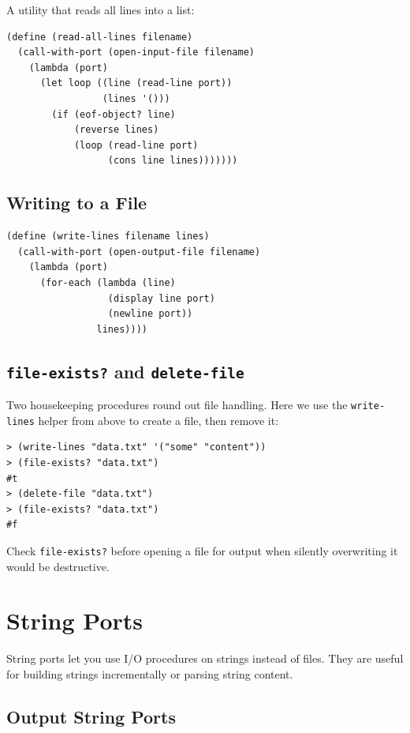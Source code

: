 A utility that reads all lines into a list:

\begin{lstlisting}
(define (read-all-lines filename)
  (call-with-port (open-input-file filename)
    (lambda (port)
      (let loop ((line (read-line port))
                 (lines '()))
        (if (eof-object? line)
            (reverse lines)
            (loop (read-line port)
                  (cons line lines)))))))
\end{lstlisting}

\subsection{Writing to a File}

\begin{lstlisting}
(define (write-lines filename lines)
  (call-with-port (open-output-file filename)
    (lambda (port)
      (for-each (lambda (line)
                  (display line port)
                  (newline port))
                lines))))
\end{lstlisting}

\subsection{\texttt{file-exists?} and \texttt{delete-file}}

Two housekeeping procedures round out file handling. Here we use the \texttt{write-lines} helper from above to create a file, then remove it:

\begin{lstlisting}[style=repl]
> (write-lines "data.txt" '("some" "content"))
> (file-exists? "data.txt")
#t
> (delete-file "data.txt")
> (file-exists? "data.txt")
#f
\end{lstlisting}

Check \texttt{file-exists?} before opening a file for output when silently overwriting it would be destructive.

\section{String Ports}

String ports let you use I/O procedures on strings instead of files. They are useful for building strings incrementally or parsing string content.

\subsection{Output String Ports}

